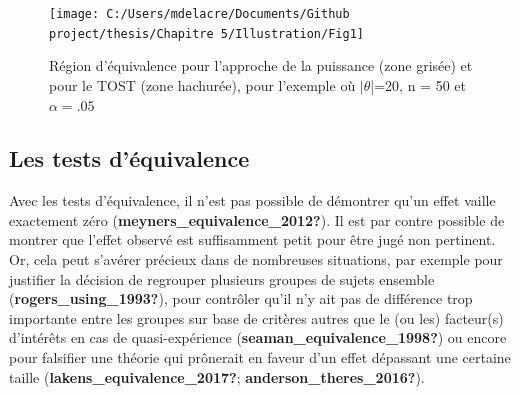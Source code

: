 \documentclass[
  english,
  man]{apa6}
\begin{document}
\begin{figure}

{\centering \texttt{[image: C:/Users/mdelacre/Documents/Github project/thesis/Chapitre 5/Illustration/Fig1]} 

}

\caption{Région d'équivalence pour l'approche de la puissance (zone grisée) et pour le TOST (zone hachurée), pour l'exemple où $|\theta$|=20, n = 50 et $\alpha=.05$}\label{fig:schuirman2}
\end{figure}

\hypertarget{les-tests-duxe9quivalence}{%
\subsection{Les tests d'équivalence}\label{les-tests-duxe9quivalence}}

Avec les tests d'équivalence, il n'est pas possible de démontrer qu'un effet vaille exactement zéro (\textbf{meyners\_equivalence\_2012?}). Il est par contre possible de montrer que l'effet observé est suffisamment petit pour être jugé non pertinent. Or, cela peut s'avérer précieux dans de nombreuses situations, par exemple pour justifier la décision de regrouper plusieurs groupes de sujets ensemble (\textbf{rogers\_using\_1993?}), pour contrôler qu'il n'y ait pas de différence trop importante entre les groupes sur base de critères autres que le (ou les) facteur(s) d'intérêts en cas de quasi-expérience (\textbf{seaman\_equivalence\_1998?}) ou encore pour falsifier une théorie qui prônerait en faveur d'un effet dépassant une certaine taille (\textbf{lakens\_equivalence\_2017?}; \textbf{anderson\_theres\_2016?}).
\end{document}
